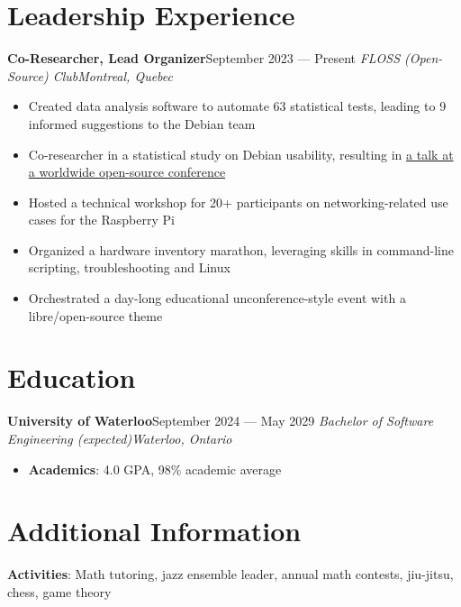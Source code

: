 \documentclass{article}
\newcommand{\newrole}[4]{
    {\normalfont\textbf{#1}\hfill#3}
    \newline
    \textit{#2}\hfill\textit{#4}
}
\newenvironment{bulletpoints}{\begin{itemize}\setlength\itemsep{-0.2em}}{\end{itemize}}
\begin{document}
\section*{Leadership Experience}
\newrole{Co-Researcher, Lead Organizer}{FLOSS (Open-Source) Club}{September 2023 --- Present}{Montreal, Quebec}
\begin{bulletpoints}
    \item Created data analysis software to automate 63 statistical tests, leading to 9 informed suggestions to the Debian team
    \item Co-researcher in a statistical study on Debian usability, resulting in \href{https://debconf24.debconf.org/talks/49-debian-installer-usability-tests-take-2/}{a talk at a worldwide open-source conference}
    \item Hosted a technical workshop for 20+ participants on networking-related use cases for the Raspberry Pi
    \item Organized a hardware inventory marathon, leveraging skills in command-line scripting, troubleshooting and Linux
    \item Orchestrated a day-long educational unconference-style event with a libre/open-source theme
\end{bulletpoints}

\section*{Education}

\newrole{University of Waterloo}{Bachelor of Software Engineering (expected)}{September 2024 --- May 2029}{Waterloo, Ontario}
\begin{bulletpoints}
    \vspace*{-2pt}
    \item {\bfseries Academics}: 4.0 GPA, 98\% academic average
\end{bulletpoints}

\section*{Additional Information}
{\bfseries Activities}: Math tutoring, jazz ensemble leader, annual math contests, jiu-jitsu, chess, game theory
\end{document}

